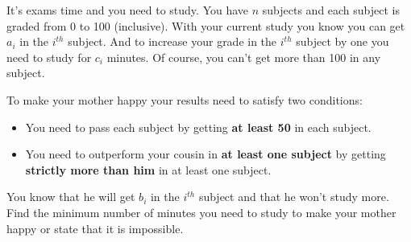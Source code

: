 It's exams time and you need to study. You have $n$ subjects and each subject is graded from 0 to 100 (inclusive). With your current study you know you can get $a_i$ in the $i^{th}$ subject. And to increase your grade in the $i^{th}$ subject by one you need to study for $c_{i}$ minutes. Of course, you can't get more than 100 in any subject.

To make your mother happy your results need to satisfy two conditions:
\begin{itemize}
\item You need to pass each subject by getting \textbf{at least 50} in each subject.
\item You need to outperform your cousin in \textbf{at least one subject} by getting \textbf{strictly more than him} in at least one subject.
\end{itemize}

You know that he will get $b_i$ in the $i^{th}$ subject and that he won't study more. Find the minimum number of minutes you need to study to make your mother happy or state that it is impossible.